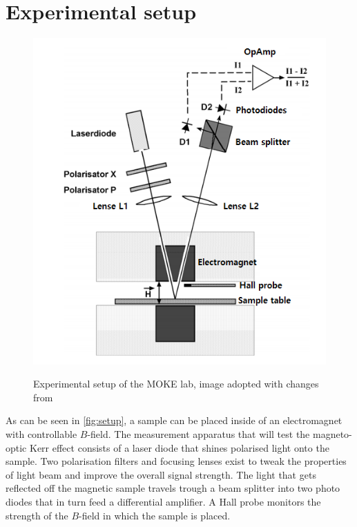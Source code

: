 
\section{Experimental setup}
\label{sec:setup}

\begin{figure}
	\label{fig:setup}
	\includegraphics[width=1.0\textwidth]{./fig/setup.png}
	\caption{}{Experimental setup of the MOKE lab, image adopted with changes from \cite{lab-manual}}
\end{figure}

As can be seen in \autoref{fig:setup}, a sample can be placed inside of an
electromagnet with controllable $B$-field. The measurement apparatus that will test
the magneto-optic Kerr effect consists of a laser diode that shines polarised light
onto the sample. Two polarisation filters and focusing lenses exist to tweak the
properties of light beam and improve the overall signal strength. The light that gets
reflected off the magnetic sample travels trough a beam splitter into two photo
diodes that in turn feed a differential amplifier. A Hall probe monitors the strength
of the $B$-field in which the sample is placed.
